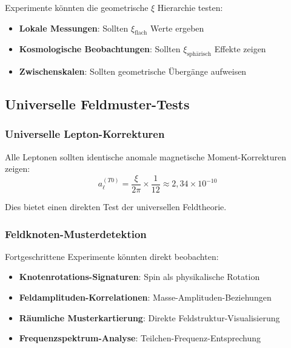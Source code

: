 \documentclass[12pt,a4paper]{article}
\newcommand{\xipar}{\ensuremath{\xi}}
\newcommand{\mypi}{\ensuremath{\pi}}
\newcommand{\mytimes}{\ensuremath{\times}}
\newcommand{\myapprox}{\ensuremath{\approx}}
\begin{document}
	Experimente könnten die geometrische $\xi$ Hierarchie testen:
	\begin{itemize}
		\item \textbf{Lokale Messungen}: Sollten $\xipar_{\text{flach}}$ Werte ergeben
		\item \textbf{Kosmologische Beobachtungen}: Sollten $\xipar_{\text{sphärisch}}$ Effekte zeigen
		\item \textbf{Zwischenskalen}: Sollten geometrische Übergänge aufweisen
	\end{itemize}
	
	\subsection{Universelle Feldmuster-Tests}
	\label{subsec:feldmuster_tests}
	
	\subsubsection{Universelle Lepton-Korrekturen}
	\label{subsubsec:universelle_lepton_korrekturen}
	
	Alle Leptonen sollten identische anomale magnetische Moment-Korrekturen zeigen:
	\begin{equation}
		a_{\ell}^{(T0)} = \frac{\xipar}{2\mypi} \mytimes \frac{1}{12} \myapprox 2,34 \mytimes 10^{-10}
		\label{eq:universelle_lepton_vorhersage}
	\end{equation}
	
	Dies bietet einen direkten Test der universellen Feldtheorie.
	
	\subsubsection{Feldknoten-Musterdetektion}
	\label{subsubsec:knotenmuster_detektion}
	
	Fortgeschrittene Experimente könnten direkt beobachten:
	\begin{itemize}
		\item \textbf{Knotenrotations-Signaturen}: Spin als physikalische Rotation
		\item \textbf{Feldamplituden-Korrelationen}: Masse-Amplituden-Beziehungen
		\item \textbf{Räumliche Musterkartierung}: Direkte Feldstruktur-Visualisierung
		\item \textbf{Frequenzspektrum-Analyse}: Teilchen-Frequenz-Entsprechung
	\end{itemize}
	
\end{document}
